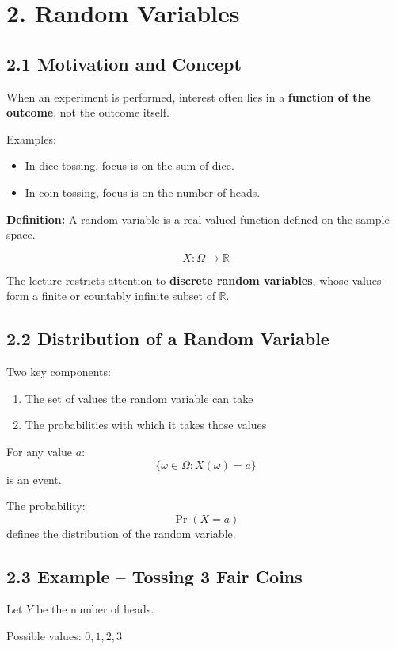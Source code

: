 \documentclass[12pt]{article}
\begin{document}
\section*{2. Random Variables}

\subsection*{2.1 Motivation and Concept}

When an experiment is performed, interest often lies in a \textbf{function of the outcome}, not the outcome itself.

Examples:
\begin{itemize}
    \item In dice tossing, focus is on the sum of dice.
    \item In coin tossing, focus is on the number of heads.
\end{itemize}

\textbf{Definition:}  
A random variable is a real-valued function defined on the sample space.

\[
X : \Omega \rightarrow \mathbb{R}
\]

The lecture restricts attention to \textbf{discrete random variables}, whose values form a finite or countably infinite subset of $\mathbb{R}$.

\subsection*{2.2 Distribution of a Random Variable}

Two key components:
\begin{enumerate}
    \item The set of values the random variable can take
    \item The probabilities with which it takes those values
\end{enumerate}

For any value $a$:
\[
\{\omega \in \Omega : X(\omega) = a\}
\]
is an event.

The probability:
\[
\Pr(X = a)
\]
defines the distribution of the random variable.

\subsection*{2.3 Example – Tossing 3 Fair Coins}

Let $Y$ be the number of heads.

Possible values: $0,1,2,3$
\end{document}
